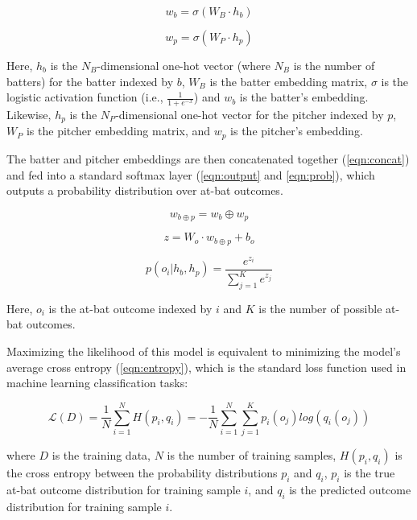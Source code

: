 \documentclass{article}
\begin{document}
\begin{equation}
\label{eqn:batter_embedding}
w_b = \sigma(W_B \cdot h_b)
\end{equation}

\begin{equation}
\label{eqn:pitcher_embedding}
w_p = \sigma(W_P \cdot h_p)
\end{equation}

Here, $h_b$ is the $N_B$-dimensional one-hot vector (where $N_B$ is the number of batters) for the batter indexed by $b$, $W_B$ is the batter embedding matrix, $\sigma$ is the logistic activation function (i.e., $\frac{1}{1 + e^{-x}}$) and $w_b$ is the batter's embedding. Likewise, $h_p$ is the $N_P$-dimensional one-hot vector for the pitcher indexed by $p$, $W_P$ is the pitcher embedding matrix, and $w_p$ is the pitcher's embedding.

The batter and pitcher embeddings are then concatenated together (\ref{eqn:concat}) and fed into a standard softmax layer (\ref{eqn:output} and \ref{eqn:prob}), which outputs a probability distribution over at-bat outcomes.

\begin{equation}
\label{eqn:concat}
w_{b \oplus p} = w_b \oplus w_p
\end{equation}

\begin{equation}
\label{eqn:output}
z = W_o \cdot w_{b \oplus p} + b_o
\end{equation}

\begin{equation}
\label{eqn:prob}
p(o_i | h_b, h_p) = \frac{e^{z_i}}{\sum_{j=1}^{K} e^{z_j}}
\end{equation}

Here, $o_i$ is the at-bat outcome indexed by $i$ and $K$ is the number of possible at-bat outcomes.

Maximizing the likelihood of this model is equivalent to minimizing the model's average cross entropy (\ref{eqn:entropy}), which is the standard loss function used in machine learning classification tasks:

\begin{equation}
\label{eqn:entropy}
\mathcal{L}(D) = \frac{1}{N}\sum_{i=1}^{N}H(p_i,q_i) = -\frac{1}{N}\sum_{i=1}^{N}\sum_{j=1}^{K} p_i(o_j)log(q_i(o_j))
\end{equation}

where $D$ is the training data, $N$ is the number of training samples, $H(p_i,q_i)$ is the cross entropy between the probability distributions $p_i$ and $q_i$, $p_i$ is the true at-bat outcome distribution for training sample $i$, and $q_i$ is the predicted outcome distribution for training sample $i$.
\end{document}
